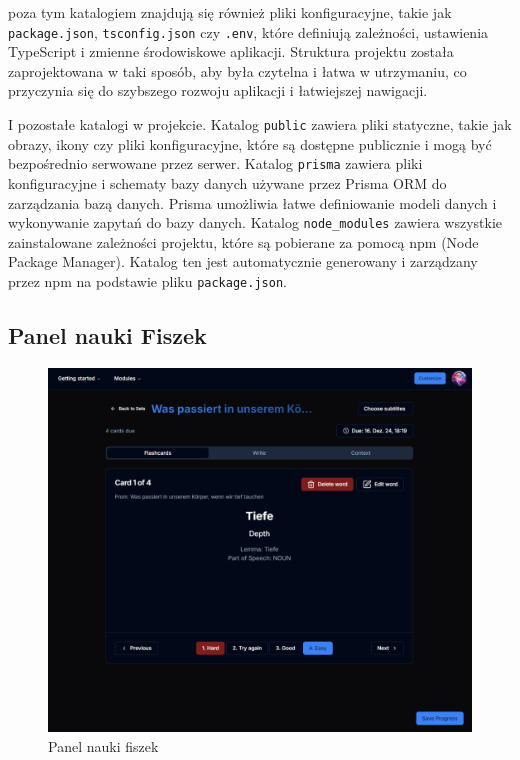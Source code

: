 poza tym katalogiem znajdują się również pliki konfiguracyjne, takie jak \texttt{package.json}, \texttt{tsconfig.json} czy \texttt{.env}, które definiują zależności, ustawienia TypeScript i zmienne środowiskowe aplikacji. Struktura projektu została zaprojektowana w taki sposób, aby była czytelna i łatwa w utrzymaniu, co przyczynia się do szybszego rozwoju aplikacji i łatwiejszej nawigacji.

I pozostałe katalogi w projekcie. Katalog \texttt{public} zawiera pliki statyczne, takie jak obrazy, ikony czy pliki konfiguracyjne, które są dostępne publicznie i mogą być bezpośrednio serwowane przez serwer. Katalog \texttt{prisma} zawiera pliki konfiguracyjne i schematy bazy danych używane przez Prisma ORM do zarządzania bazą danych. Prisma umożliwia łatwe definiowanie modeli danych i wykonywanie zapytań do bazy danych. Katalog \texttt{node\_modules} zawiera wszystkie zainstalowane zależności projektu, które są pobierane za pomocą npm (Node Package Manager). Katalog ten jest automatycznie generowany i zarządzany przez npm na podstawie pliku \texttt{package.json}.

\subsection{Panel nauki Fiszek}
\begin{figure}[H]
    \centering
    \includegraphics[width=1\textwidth]{IMAGE/FlashcardsLearn.png}
    \caption{Panel nauki fiszek}
    \label{fig:FlashcardsLearn}
\end{figure}

